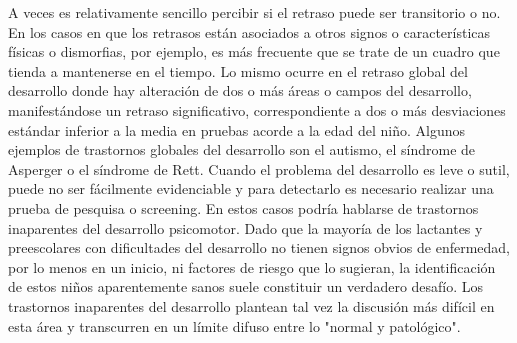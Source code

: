 			A veces es relativamente sencillo percibir si el retraso puede ser transitorio o no. En los casos en que los retrasos están asociados a otros signos o características físicas o dismorfias, por ejemplo, es más frecuente que se trate de un cuadro que tienda a mantenerse en el tiempo. Lo mismo ocurre en el retraso global del desarrollo donde hay alteración de dos o más áreas o campos del desarrollo, manifestándose un retraso significativo, correspondiente a dos o más desviaciones estándar inferior a la media en pruebas acorde a la edad del niño. Algunos ejemplos de trastornos globales del desarrollo son el autismo, el síndrome de Asperger o el síndrome de Rett. Cuando el problema del desarrollo es leve o sutil, puede no ser fácilmente evidenciable y para detectarlo es necesario realizar una prueba de pesquisa o screening. En estos casos podría hablarse de trastornos inaparentes del desarrollo psicomotor. Dado que la mayoría de los lactantes y preescolares con dificultades del desarrollo no tienen signos obvios de enfermedad, por lo menos en un inicio, ni factores de riesgo que lo sugieran, la identificación de estos niños aparentemente sanos suele constituir un verdadero desafío. Los trastornos inaparentes del desarrollo plantean tal vez la discusión más difícil en esta área y transcurren en un límite difuso entre lo "normal y patológico".\\
